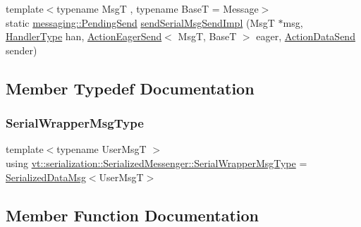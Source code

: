 \begin{DoxyCompactItemize}
\item 
{\footnotesize template$<$typename MsgT , typename BaseT  = Message$>$ }\\static \hyperlink{structvt_1_1messaging_1_1_pending_send}{messaging\+::\+Pending\+Send} \hyperlink{structvt_1_1serialization_1_1_serialized_messenger_abf1608ea281ed8c48f521ac1e90d9969}{send\+Serial\+Msg\+Send\+Impl} (MsgT $\ast$msg, \hyperlink{namespacevt_af64846b57dfcaf104da3ef6967917573}{Handler\+Type} han, \hyperlink{namespacevt_1_1serialization_a009aa1de8d42a3c97643b947fcc6f0b6}{Action\+Eager\+Send}$<$ MsgT, BaseT $>$ eager, \hyperlink{namespacevt_1_1serialization_afffcac0da80b78e77ef8043dba4e814f}{Action\+Data\+Send} sender)
\end{DoxyCompactItemize}


\subsection{Member Typedef Documentation}
\mbox{\label{structvt_1_1serialization_1_1_serialized_messenger_a279027d1664b42cf7f288dc3fc9c3014}} 
\subsubsection{\texorpdfstring{Serial\+Wrapper\+Msg\+Type}{SerialWrapperMsgType}}
{\footnotesize\ttfamily template$<$typename User\+MsgT $>$ \\
using \hyperlink{structvt_1_1serialization_1_1_serialized_messenger_a279027d1664b42cf7f288dc3fc9c3014}{vt\+::serialization\+::\+Serialized\+Messenger\+::\+Serial\+Wrapper\+Msg\+Type} =  \hyperlink{namespacevt_1_1serialization_a56d2aee859dc963c2b5fad82649dd79a}{Serialized\+Data\+Msg}$<$User\+MsgT$>$}



\subsection{Member Function Documentation}
\mbox{\label{structvt_1_1serialization_1_1_serialized_messenger_addd144d5384b068bc4bf37eaf17461a5}} 
